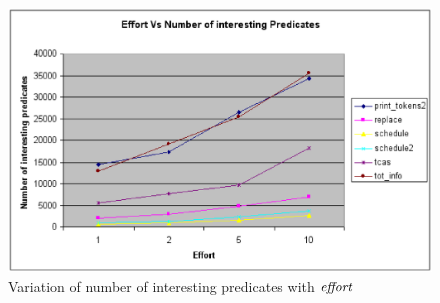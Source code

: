 \begin{figure}
  \centering
  \includegraphics{charts/effort}
  \caption{Variation of number of interesting predicates with $\mathit{effort}$}
  \label{fig-effort}
\end{figure}

